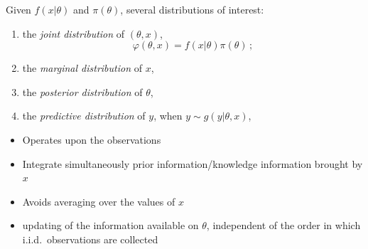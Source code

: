 \begin{slide}

Given $f(x|\theta)$ and $\pi(\theta)$, several distributions of interest:
   \begin{enumerate}
\item the {\it joint distribution} of $(\theta,x)$,
$$
     \varphi(\theta,x) = f(x|\theta)\pi(\theta)\,;
$$

\pause
\item the {\it marginal distribution} of $x$, 
{}
\end{enumerate}

\end{slide}\begin{slide}
   \begin{enumerate}
   \setcounter{enumi}{2}
\item the {\it posterior distribution} of $\theta$,
{}
\item the {\it predictive distribution} of $y$, when $y\sim g(y|\theta,x)$,
{}
    \end{enumerate}

\end{slide}\begin{slide}
{}
\begin{itemize}
\item Operates  {} upon the observations

\pause
\item Integrate simultaneously prior information/knowledge {} 
information brought by $x$

\pause
\item Avoids averaging over the {} values of $x$

\pause
\item {} updating of the information available on $\theta$, independent of the
      order in which i.i.d.\ observations are collected


\end{itemize}
\end{slide}
